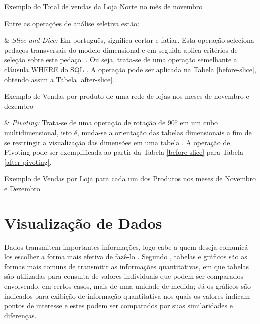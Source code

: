 \begin{table}[!ht]
\centering

\caption{Exemplo do Total de vendas da Loja Norte no mês de novembro}
\label{after-across}
\end{table}
\FloatBarrier

Entre as operações de análise seletiva estão:

\begin{easylist}[itemize]

& \textit{Slice and Dice:} Em português, significa cortar e fatiar. Esta operação seleciona pedaços transversais do modelo dimensional e em seguida aplica critérios de seleção sobre este pedaço. \cite{andre2000}. Ou seja, trata-se de uma operação semelhante a cláusula WHERE do SQL \cite{valeria2012}. A operação pode ser aplicada na Tabela \ref{before-slice}, obtendo assim a Tabela \ref{after-slice}.


\end{easylist}

\begin{table}[ht]
\centering

\caption{Exemplo de Vendas por produto de uma rede de lojas nos meses de novembro e dezembro}
\label{before-slice}
\end{table}


\begin{table}[ht]
\centering

\label{after-slice}
\end{table}


\begin{easylist}[itemize]

& \textit{Pivoting:} Trata-se de uma operação de rotação de 90º em um cubo multidimensional, isto é, muda-se a orientação das tabelas dimensionais a fim de se restringir a visualização das dimensões em uma tabela \cite{andre2000}. A operação de Pivoting pode ser exemplificada ao partir da Tabela \ref{before-slice} para Tabela \ref{after-pivoting}.


\end{easylist}



\begin{table}[!ht]
\centering

\caption{Exemplo de Vendas por Loja para cada um dos Produtos nos meses de Novembro e Dezembro}
\label{after-pivoting}
\end{table}



\section {Visualização de Dados}

Dados transmitem importantes informações, logo cabe a quem deseja comunicá-los escolher a forma mais efetiva de fazê-lo \cite{raquel2013}. Segundo , tabelas e gráficos são as formas mais comuns de transmitir as informações quantitativas, em que tabelas são utilizadas para consulta de valores individuais que podem ser comparados envolvendo, em certos casos, mais de uma unidade de medida; Já os gráficos são indicados para exibição de informação quantitativa nos quais os valores indicam pontos de interesse e estes podem ser comparados por suas similaridades e diferenças.
